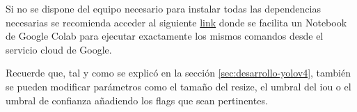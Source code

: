 Si no se dispone del equipo necesario para instalar todas las dependencias necesarias se recomienda acceder al siguiente \href{https://colab.research.google.com/drive/18vL9LH8e9VaimA9LzBD35Cn4AOm6C17I?usp=sharing}{link} donde se facilita un Notebook de Google Colab para ejecutar exactamente los mismos comandos desde el servicio cloud de Google.

Recuerde que, tal y como se explicó en la sección \ref{sec:desarrollo-yolov4}, también se pueden modificar parámetros como el tamaño del resize, el umbral del \gls{iou} o el umbral de confianza añadiendo los flags que sean pertinentes.